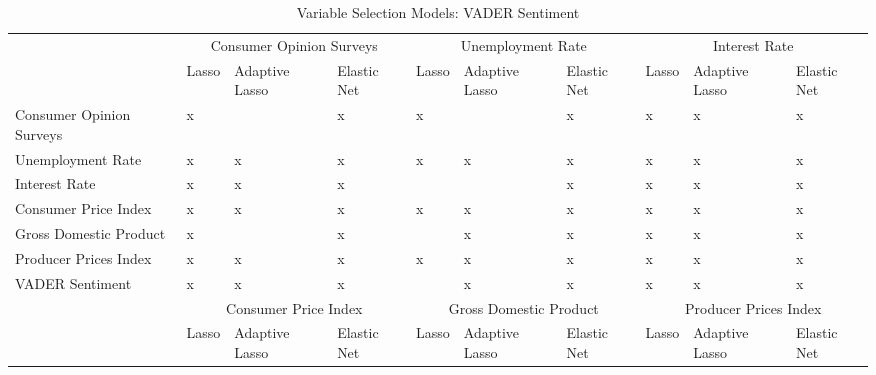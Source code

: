 \begin{landscape}
\begin{table}[]
\caption{Variable Selection Models: VADER Sentiment}
\label{tab:selectionvader}
\begin{adjustbox}{max width=\linewidth}
\begin{tabular}{llllllllll}
\hline
                         & \multicolumn{3}{c}{Consumer Opinion   Surveys} & \multicolumn{3}{c}{Unemployment Rate}      & \multicolumn{3}{c}{Interest Rate}         \\
                         & Lasso     & Adaptive Lasso    & Elastic Net    & Lasso    & Adaptive Lasso   & Elastic Net  & Lasso   & Adaptive Lasso   & Elastic Net  \\
Consumer Opinion Surveys & x         &                   & x              & x        &                  & x            & x       & x                & x            \\
Unemployment Rate        & x         & x                 & x              & x        & x                & x            & x       & x                & x            \\
Interest Rate            & x         & x                 & x              &          &                  & x            & x       & x                & x            \\
Consumer Price Index     & x         & x                 & x              & x        & x                & x            & x       & x                & x            \\
Gross Domestic Product   & x         &                   & x              &          & x                & x            & x       & x                & x            \\
Producer Prices Index    & x         & x                 & x              & x        & x                & x            & x       & x                & x            \\ \hline
VADER Sentiment          & x         & x                 & x              &          & x                & x            & x       & x                & x            \\ \hline
                         & \multicolumn{3}{c}{Consumer Price Index}       & \multicolumn{3}{c}{Gross Domestic Product} & \multicolumn{3}{c}{Producer Prices Index} \\
                         & Lasso     & Adaptive Lasso    & Elastic Net    & Lasso    & Adaptive Lasso   & Elastic Net  & Lasso   & Adaptive Lasso   & Elastic Net  \\

\end{tabular}
\end{adjustbox}
\end{table}
\end{landscape}
